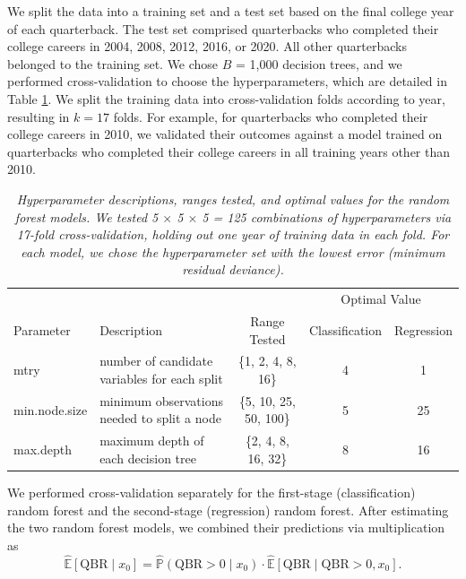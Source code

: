 \documentclass[Review, sageh, times, doublespace]{sagej}
\newcommand{\revision}[1]{{\color{orange} #1}}
\begin{document}
We split the data into a training set and a test set based on the final college year of each quarterback. The test set comprised quarterbacks who completed their college careers in 2004, 2008, 2012, 2016, or 2020. All other quarterbacks belonged to the training set. We chose $B$ = 1,000 decision trees, and we performed cross-validation to choose the hyperparameters, which are detailed in Table \ref{tab:hyperparameters}. We split the training data into cross-validation folds according to year, resulting in $k = 17$ folds. For example, for quarterbacks who completed their college careers in 2010, we validated their outcomes against a model trained on quarterbacks who completed their college careers in all training years other than 2010.

\begin{table}[H]
    \centering \small
    \begin{tabular}{m{17mm}|>{\raggedright\arraybackslash}m{29mm}|c|cc}
        & & & \multicolumn{2}{c}{Optimal Value}\\
        Parameter & Description & Range Tested & Classification & Regression\\
        \hline
        mtry & number of candidate variables for each split & \{1, 2, 4, 8, 16\} & 4 & 1\\
        \hline
        min.node.size & minimum observations needed to split a node & \{5, 10, 25, 50, 100\} & 5 & 25\\
        \hline
        max.depth & maximum depth of each decision tree & \{2, 4, 8, 16, 32\} & 8 & 16\\
    \end{tabular}
    \caption{
      \it Hyperparameter descriptions, ranges tested, and optimal values for the random forest models. We tested 5 $\times$ 5 $\times$ 5 = 125 combinations of hyperparameters via 17-fold cross-validation, holding out one year of training data in each fold. For each model, we chose \revision{the} hyperparameter set with the lowest error (minimum residual deviance).
    }
    \label{tab:hyperparameters}
\end{table}

We performed cross-validation separately for the first-stage (classification) random forest and the second-stage (regression) random forest. After estimating the two random forest models, we combined their predictions via multiplication as  
\begin{equation*}
  \widehat{\mathbb{E}}\!\left[ \text{QBR} \mid {x}_0 \right]
    =
    \widehat{\mathbb{P}}\!\left( \text{QBR} > 0 \mid {x}_0 \right)
      \cdot
      \widehat{\mathbb{E}}\!\left[ \text{QBR} \mid \text{QBR} > 0, {x}_0 \right].
\end{equation*}
\end{document}
